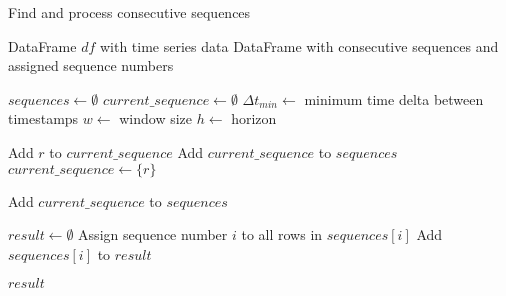 \begin{algorithm}
    \caption{Find and process consecutive sequences}
    \begin{algorithmic}[1]
        \Require DataFrame $df$ with time series data
        \Ensure DataFrame with consecutive sequences and assigned sequence numbers

        \State $sequences \gets \emptyset$
        \State $current\_sequence \gets \emptyset$
        \State $\Delta t_{min} \gets$ minimum time delta between timestamps
        \State $w \gets$ window size
        \State $h \gets$ horizon

        \State Add $r$ to $current\_sequence$
        \Else
        \State Add $current\_sequence$ to $sequences$
        \EndIf
        \State $current\_sequence \gets \{r\}$
        \EndIf
        \EndFor

        \State Add $current\_sequence$ to $sequences$
        \EndIf

        \State $result \gets \emptyset$
        \State Assign sequence number $i$ to all rows in $sequences[i]$
        \State Add $sequences[i]$ to $result$
        \EndFor

        \State \Return $result$
        \EndFunction
    \end{algorithmic}
    \label{alg:process_consecutive_sequences}
\end{algorithm}